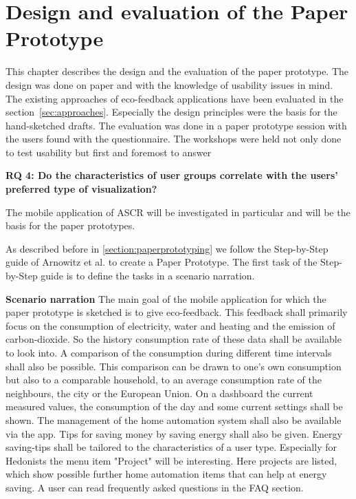 \chapter{Design and evaluation of the Paper Prototype}


This chapter describes the design and the evaluation of the paper prototype. The design was done on paper and with the knowledge of usability issues in mind. The existing approaches of eco-feedback applications have been evaluated in the section~\ref{sec:approaches}. Especially the design principles were the basis for the hand-sketched drafts. The evaluation was done in a paper prototype session with the users found with the questionnaire. The workshops were held not only done to test usability but first and foremost to answer 

\textbf{RQ 4: Do the characteristics of user groups correlate with the users' preferred type of visualization?}

The mobile application of ASCR will be investigated in particular and will be the basis for the paper prototypes.

As described before in \ref{section:paperprototyping} we follow the Step-by-Step guide of Arnowitz et al. \cite{arnowitz2010effective} to create a Paper Prototype. The first task of the Step-by-Step guide is to define the tasks in a scenario narration.

\textbf{Scenario narration} \quad The main goal of the mobile application for which the paper prototype is sketched is to give eco-feedback. This feedback shall primarily focus on the consumption of electricity, water and heating and the emission of carbon-dioxide. So the history consumption rate of these data shall be available to look into. A comparison of the consumption during different time intervals shall also be possible. This comparison can be drawn to one's own consumption but also to a comparable household, to an average consumption rate of the neighbours, the city or the European Union. On a dashboard the current measured values, the consumption of the day and some current settings shall be shown. The management of the home automation system shall also be available via the app. Tips for saving money by saving energy shall also be given. Energy saving-tips shall be tailored to the characteristics of a user type. Especially for Hedonists the menu item "Project" will be interesting. Here projects are listed, which show possible further home automation items that can help at energy saving. A user can read frequently asked questions in the FAQ section.

